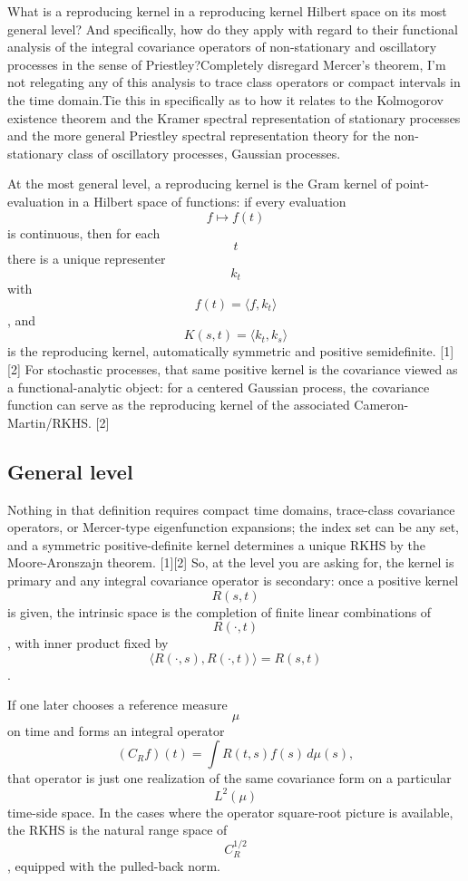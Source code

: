 \documentclass[
]{article}
\author{}
\date{}
\begin{document}
What is a reproducing kernel in a reproducing kernel Hilbert space on
its most general level? And specifically, how do they apply with regard
to their functional analysis of the integral covariance operators of
non-stationary and oscillatory processes in the sense of
Priestley?Completely disregard Mercer's theorem, I'm not relegating any
of this analysis to trace class operators or compact intervals in the
time domain.Tie this in specifically as to how it relates to the
Kolmogorov existence theorem and the Kramer spectral representation of
stationary processes and the more general Priestley spectral
representation theory for the non-stationary class of oscillatory
processes, Gaussian processes.

At the most general level, a reproducing kernel is the Gram kernel of
point-evaluation in a Hilbert space of functions: if every evaluation
\[f \mapsto f(t)\] is continuous, then for each \[t\] there is a unique
representer \[k_t\] with \[f(t)=\langle f,k_t\rangle\], and
\[K(s,t)=\langle k_t,k_s\rangle\] is the reproducing kernel,
automatically symmetric and positive semidefinite. {[}1{]}{[}2{]} For
stochastic processes, that same positive kernel is the covariance viewed
as a functional-analytic object: for a centered Gaussian process, the
covariance function can serve as the reproducing kernel of the
associated Cameron-Martin/RKHS. {[}2{]}

\subsection{General level}\label{general-level}

Nothing in that definition requires compact time domains, trace-class
covariance operators, or Mercer-type eigenfunction expansions; the index
set can be any set, and a symmetric positive-definite kernel determines
a unique RKHS by the Moore-Aronszajn theorem. {[}1{]}{[}2{]} So, at the
level you are asking for, the kernel is primary and any integral
covariance operator is secondary: once a positive kernel \[R(s,t)\] is
given, the intrinsic space is the completion of finite linear
combinations of \[R(\cdot,t)\], with inner product fixed by
\[\langle R(\cdot,s),R(\cdot,t)\rangle = R(s,t)\].

If one later chooses a reference measure \[\mu\] on time and forms an
integral operator \[
(C_R f)(t)=\int R(t,s)f(s)\,d\mu(s),
\] that operator is just one realization of the same covariance form on
a particular \[L^2(\mu)\] time-side space. In the cases where the
operator square-root picture is available, the RKHS is the natural range
space of \[C_R^{1/2}\], equipped with the pulled-back norm.
\end{document}
